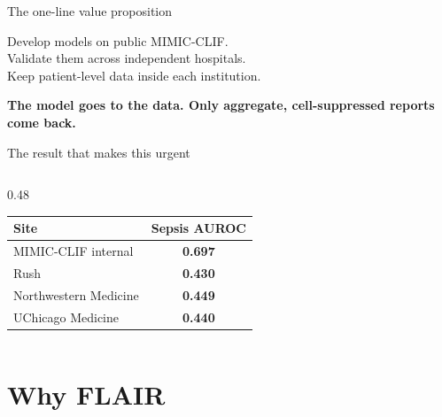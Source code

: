 \documentclass[aspectratio=169,11pt,xcolor={table}]{beamer}
\newcommand{\emphc}[1]{{\color{flairblue}\textbf{#1}}}
\newcommand{\rushc}[1]{{\color{flairred}\textbf{#1}}}
\begin{document}
\begin{frame}{The one-line value proposition}
  \vfill
  \begin{center}
    {\Large Develop models on public MIMIC-CLIF.}\\[0.7em]
    {\Large Validate them across independent hospitals.}\\[0.7em]
    {\Large Keep patient-level data inside each institution.}
  \end{center}
  \vfill
  \begin{center}\color{flairblue}\Large\textbf{The model goes to the data. Only aggregate, cell-suppressed reports come back.}\end{center}
  \vfill
\end{frame}

\begin{frame}{The result that makes this urgent}
  \small
  \begin{columns}[c]
  \begin{column}{0.48\textwidth}
    \begin{center}
    \large
    \begin{tabular}{lc}
      \toprule
      \textbf{Site} & \textbf{Sepsis AUROC} \\
      \midrule
      MIMIC-CLIF internal & \emphc{0.697} \\
      Rush & \rushc{0.430} \\
      Northwestern Medicine & \rushc{0.449} \\
      UChicago Medicine & \rushc{0.440} \\
      \bottomrule
    \end{tabular}
    \end{center}
  \end{column}
  \end{columns}
\end{frame}

\section{Why FLAIR}
\end{document}
